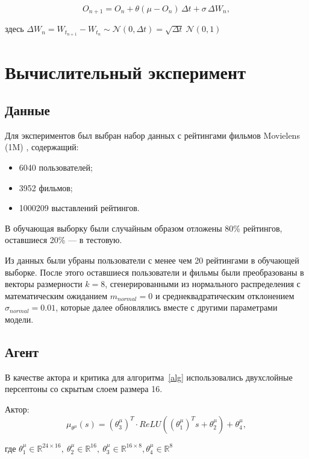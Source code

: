 \documentclass[14pt]{extarticle}
\begin{document}
$$O_{n+1}= O_n + \theta (\mu - O_{n})\,\Delta t+\sigma \,\Delta W_{n}, $$

здесь $\Delta W_n = W_{t_{n+1}} - W_{t_n} \sim \mathcal{N}(0, \Delta t) = \sqrt{\Delta t}\ \mathcal{N}(0, 1)$

\newpage

\section{Вычислительный эксперимент}

\subsection{Данные}

Для экспериментов был выбран набор данных с рейтингами фильмов Movielens (1M) \cite{ML_1M}, содержащий:

\begin{itemize}
    \item 6040 пользователей;
    \item 3952 фильмов;
    \item 1000209 выставлений рейтингов.
\end{itemize}

В обучающая выборку были случайным образом отложены 80\% рейтингов, оставшиеся 20\% --- в тестовую.

Из данных были убраны пользователи с менее чем 20 рейтингами в обучающей выборке. После этого оставшиеся пользователи и фильмы были преобразованы в векторы размерности $k=8$, сгенерированными из нормального распределения с математическим ожиданием $m_{normal}=0$ и среднеквадратическим отклонением $\sigma_{normal}=0.01$, которые далее обновлялись вместе с другими параметрами модели.

\subsection{Агент}

В качестве актора и критика для алгоритма~\ref{alg} использовались двухслойные персептоны со скрытым слоем размера 16.

Актор: $$\mu_{\theta^{\mu}}(s) = \left(\theta^{\mu}_{3}\right)^T \cdot ReLU\left(\left(\theta^{\mu}_{1}\right)^T s + \theta^{\mu}_2\right) + \theta^{\mu}_{4},$$

где $\theta^{\mu}_1 \in \mathbb{R}^{24\times16},\ \theta^{\mu}_2 \in \mathbb{R}^{16}, \ \theta^{\mu}_3 \in \mathbb{R}^{16\times 8}, \theta^{\mu}_4 \in \mathbb{R}^{8} $
\end{document}

